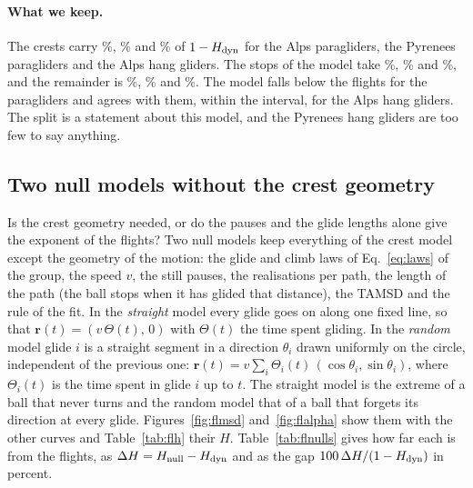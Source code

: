 \documentclass[11pt,a4paper]{article}
\begin{document}
\paragraph{What we keep.} The crests carry \flPctGeometryAlpsPara\%, \flPctGeometryPyrPara\% and
\flPctGeometryAlpsHang\% of $1 - \Hdyn$ for the Alps paragliders, the Pyrenees paragliders and the Alps hang
gliders. The stops of the model take \flPctInterAlpsPara\%, \flPctInterPyrPara\% and \flPctInterAlpsHang\%, and
the remainder is \flPctOtherAlpsPara\%, \flPctOtherPyrPara\% and \flPctOtherAlpsHang\%. The model falls below
the flights for the paragliders and agrees with them, within the interval, for the Alps hang gliders. The split
is a statement about this model, and the Pyrenees hang gliders are too few to say anything.

\subsection{Two null models without the crest geometry}\label{sec:flnull}

Is the crest geometry needed, or do the pauses and the glide lengths alone give the exponent of the flights? Two null
models keep everything of the crest model except the geometry of the motion: the glide and climb laws of
Eq.~\eqref{eq:laws} of the group, the speed $v$, the still pauses, the \flNReal{} realisations per path, the length of
the path (the ball stops when it has glided that distance), the TAMSD and the rule of the fit. In the \emph{straight}
model every glide goes on along one fixed line, so that $\mathbf r(t) = (v\,\Theta(t),\,0)$ with $\Theta(t)$ the time
spent gliding. In the \emph{random} model glide $i$ is a straight segment in a direction $\theta_i$ drawn uniformly on the
circle, independent of the previous one: $\mathbf r(t) = v\sum_i \Theta_i(t)\,(\cos\theta_i, \sin\theta_i)$, where
$\Theta_i(t)$ is the time spent in glide $i$ up to $t$. The straight model is the extreme of a ball that never turns and
the random model that of a ball that forgets its direction at every glide. Figures~\ref{fig:flmsd} and~\ref{fig:flalpha}
show them with the other curves and Table~\ref{tab:flh} their $H$. Table~\ref{tab:flnulls} gives how far each is from the
flights, as $\Delta H = H_{\mathrm{null}} - H_{\mathrm{dyn}}$ and as the gap $100\,\Delta H/(1-H_{\mathrm{dyn}})$ in percent.

\begin{table}[t]
\centering
\caption{$H$ of the null models and their distance to the flights: $\Delta H$ and the gap as a percentage of
$1-\Hdyn$, with 95\% intervals. A positive gap means $H$ above the flights.}
\label{tab:flnulls}
\scriptsize
\setlength{\tabcolsep}{2pt}

\end{table}
\end{document}
